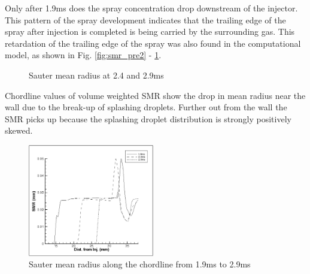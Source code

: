 \documentclass[a4paper,10pt]{article}
\begin{document}
Only after 1.9ms does the spray concentration drop downstream of the injector. This pattern of the spray development indicates that the trailing edge of the spray after injection is completed is being carried by the surrounding gas. This retardation of the trailing edge of the spray was also found in the computational model, as shown in Fig. \ref{fig:smr_pre2} - \ref{fig:smr_pre3}.
\begin{figure}[H]
\centering
{}
\caption{Sauter mean radius at 2.4 and 2.9ms}
\label{fig:smr_pre3}
\end{figure}

Chordline values of volume weighted SMR show the drop in mean radius near the wall due to the break-up of splashing droplets. Further out from the wall the SMR picks up because the splashing droplet distribution is strongly positively skewed.
\begin{figure}[H]
\centering
\includegraphics[width=0.49\textwidth]{smr_2p9b_cl_fix.eps}
\caption{Sauter mean radius along the chordline from 1.9ms to 2.9ms}
\label{fig:smr_2p9b_cl}
\end{figure}
\end{document}
